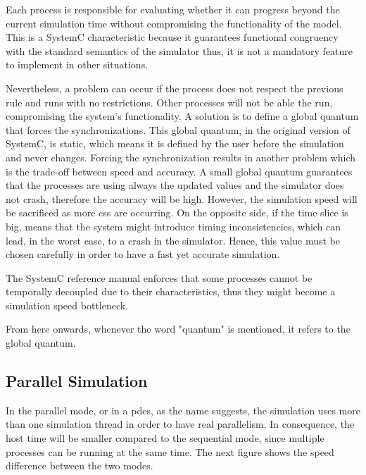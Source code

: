 Each process is responsible for evaluating whether it can progress beyond the current simulation time without compromising the functionality 
of the model. This is a SystemC characteristic because it guarantees functional congruency with the standard semantics of the simulator thus, 
it is not a mandatory feature to implement in other situations. 

Nevertheless, a problem can occur if the process does not respect the previous rule and runs with no restrictions. Other processes will not be 
able the run, compromising the system's functionality. A solution is to define a global quantum that forces the synchronizations. This global 
quantum, in the original version of SystemC, is static, which means it is defined by the user before the simulation and never changes. Forcing 
the synchronization results in another problem which is the trade-off between speed and accuracy. A small global quantum guarantees that the 
processes are using always the updated values and the simulator does not crash, therefore the accuracy will be high. However, the simulation 
speed will be sacrificed as more \glspl{cs} are occurring. On the opposite side, if the time slice is big, means that the system might introduce 
timing inconsistencies, which can lead, in the worst case, to a crash in the simulator. Hence, this value must be chosen carefully in order to 
have a fast yet accurate simulation.  

The SystemC reference manual \cite{systemC} enforces that some processes cannot be temporally decoupled due to their characteristics, thus 
they might become a simulation speed bottleneck. 

From here onwards, whenever the word "quantum" is mentioned, it refers to the global quantum.

\subsection{Parallel Simulation}
\label{cap:ParallelSim}

In the parallel mode, or in a \gls{pdes}, as the name suggests, the simulation uses more than one simulation thread in order to have real 
parallelism. In consequence, the host time will be smaller compared to the sequential mode, since multiple processes can be running at the 
same time. The next figure shows the speed difference between the two modes.


